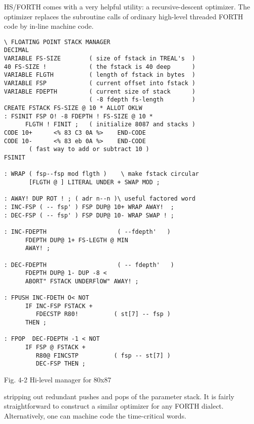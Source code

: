 HS/FORTH comes with a very helpful utility: a recursive-descent optimizer. The optimizer replaces the subroutine calls of ordinary high-level threaded FORTH code by in-line machine code.

\begin{lstlisting}[frame=single, float]
\ FLOATING POINT STACK MANAGER
DECIMAL
VARIABLE FS-SIZE        ( size of fstack in TREAL's  ) 
40 FS-SIZE !            ( the fstack is 40 deep      )
VARIABLE FLGTH          ( length of fstack in bytes  )
VARIABLE FSP            ( current offset into fstack )
VARIABLE FDEPTH         ( current size of stack      )
                        ( -8 fdepth fs-length        )
CREATE FSTACK FS-SIZE @ 10 * ALLOT OKLW
: FSINIT FSP O! -8 FDEPTH ! FS-SIZE @ 10 *
      FLGTH ! FINIT ;   ( initialize 8087 and stacks )
CODE 10+      <% 83 C3 0A %>    END-CODE
CODE 10-      <% 83 eb 0A %>    END-CODE
       ( fast way to add or subtract 10 )
FSINIT

: WRAP ( fsp--fsp mod flgth )    \ make fstack circular
       [FLGTH @ ] LITERAL UNDER + SWAP MOD ;

: AWAY! DUP ROT ! ; ( adr n--n )\ useful factored word
: INC-FSP ( -- fsp' ) FSP DUP@ 10+ WRAP AWAY!  ;
: DEC-FSP ( -- fsp' ) FSP DUP@ 10- WRAP SWAP ! ;

: INC-FDEPTH                    ( --fdepth'   )
      FDEPTH DUP@ 1+ FS-LEGTH @ MIN
      AWAY! ;

: DEC-FDEPTH                    ( -- fdepth'   )
      FDEPTH DUP@ 1- DUP -8 <
      ABORT" FSTACK UNDERFlOW" AWAY! ;

: FPUSH INC-FDETH O< NOT
      IF INC-FSP FSTACK +
         FDECSTP R80!          ( st[7] -- fsp )
      THEN ;

: FPOP  DEC-FDEPTH -1 < NOT
      IF FSP @ FSTACK +
         R80@ FINCSTP          ( fsp -- st[7] )
         DEC-FSP THEN ;
\end{lstlisting}
Fig. 4-2 Hi-level manager for 80x87

stripping out redundant pushes and pops of the parameter stack. It is fairly straightforward to construct a similar optimizer for any FORTH dialect. Alternatively, one can machine code the time-critical words.

